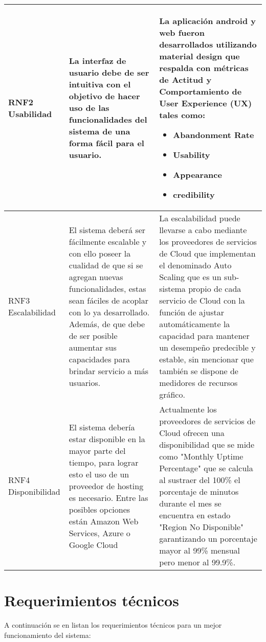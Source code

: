  \begin{tabularx}{1.0\textwidth} { 
		| >{\raggedright\arraybackslash}X 
		| >{\arraybackslash}X 
		| >{\raggedright\arraybackslash}X | }
	
	\hline
	RNF2 Usabilidad  & La interfaz de usuario debe de ser intuitiva con el objetivo de hacer uso de las funcionalidades del sistema de una forma fácil para el usuario.  & La aplicación android y web fueron desarrollados utilizando material design que respalda con métricas de Actitud y Comportamiento de User Experience (UX) tales como:
	\begin{itemize}
		\item Abandonment Rate
		\item Usability
		\item Appearance
		\item credibility
	\end{itemize}  \\
	\hline
		RNF3 Escalabilidad  &   El sistema deberá ser fácilmente escalable y con ello poseer la cualidad de que si se agregan nuevas funcionalidades, estas sean fáciles de acoplar con lo ya desarrollado. Además, de que debe de ser posible aumentar sus capacidades para brindar servicio a más usuarios.
	& La escalabilidad puede llevarse a cabo mediante los proveedores de servicios de Cloud que implementan el denominado Auto Scaling que es un sub-sistema propio de cada servicio de Cloud con la función de ajustar automáticamente la capacidad para mantener un desempeño predecible y estable, sin mencionar que también se dispone de medidores de recursos gráfico.  \\
	\hline
RNF4 Disponibilidad  &   El sistema debería estar disponible en la mayor parte del tiempo, para lograr esto el uso de un proveedor de hosting es necesario. Entre las posibles opciones están Amazon Web Services, Azure o Google Cloud
&   Actualmente los proveedores de servicios de Cloud ofrecen una disponibilidad que se mide como "Monthly Uptime Percentage" que se calcula al sustraer del 100\% el porcentaje de minutos durante el mes se encuentra en estado "Region No Disponible" garantizando un porcentaje mayor al 99\% mensual pero menor al 99.9\%. \\
\hline
 \end{tabularx}
            
\section{Requerimientos técnicos}
    A continuación se en listan los requerimientos técnicos para un mejor funcionamiento del sistema:

